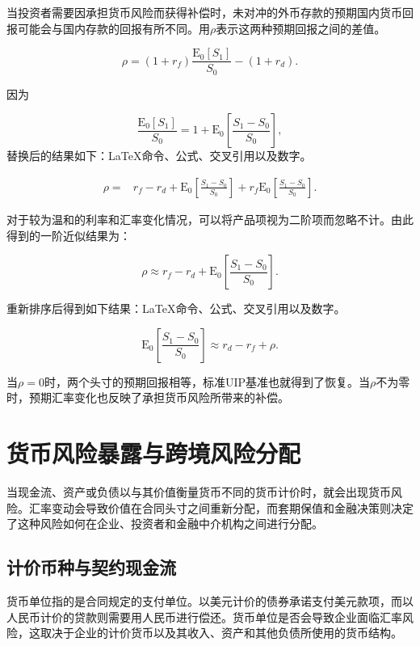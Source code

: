 当投资者需要因承担货币风险而获得补偿时，未对冲的外币存款的预期国内货币回报可能会与国内存款的回报有所不同。用$\rho$表示这两种预期回报之间的差值。

\begin{equation}
\rho
=
(1+r_f)\frac{\mathrm{E}_0[S_1]}{S_0}
-
(1+r_d).
\label{eq:ch10-currency-risk-premium}
\end{equation}

因为

\[
\frac{\mathrm{E}_0[S_1]}{S_0}
=
1+
\mathrm{E}_0\left[\frac{S_1-S_0}{S_0}\right],
\]
替换后的结果如下：LaTeX命令、公式、交叉引用以及数字。

\begin{align}
\rho
={}&r_f-r_d
+\mathrm{E}_0\left[\frac{S_1-S_0}{S_0}\right]
+r_f\mathrm{E}_0\left[\frac{S_1-S_0}{S_0}\right].
\end{align}

对于较为温和的利率和汇率变化情况，可以将产品项视为二阶项而忽略不计。由此得到的一阶近似结果为：

\begin{equation}
\rho
\approx
r_f-r_d
+
\mathrm{E}_0\left[\frac{S_1-S_0}{S_0}\right].
\label{eq:ch10-currency-risk-premium-approx}
\end{equation}

重新排序后得到如下结果：LaTeX命令、公式、交叉引用以及数字。

\begin{equation}
\mathrm{E}_0\left[\frac{S_1-S_0}{S_0}\right]
\approx
r_d-r_f+\rho.
\label{eq:ch10-uip-with-risk-premium}
\end{equation}

当$\rho=0$时，两个头寸的预期回报相等，标准UIP基准也就得到了恢复。当$\rho$不为零时，预期汇率变化也反映了承担货币风险所带来的补偿。


\section[货币风险暴露与跨境风险分配]{货币风险暴露与跨境风险分配}

当现金流、资产或负债以与其价值衡量货币不同的货币计价时，就会出现货币风险。汇率变动会导致价值在合同头寸之间重新分配，而套期保值和金融决策则决定了这种风险如何在企业、投资者和金融中介机构之间进行分配。

\subsection{计价币种与契约现金流}

货币单位指的是合同规定的支付单位。以美元计价的债券承诺支付美元款项，而以人民币计价的贷款则需要用人民币进行偿还。货币单位是否会导致企业面临汇率风险，这取决于企业的计价货币以及其收入、资产和其他负债所使用的货币结构。

